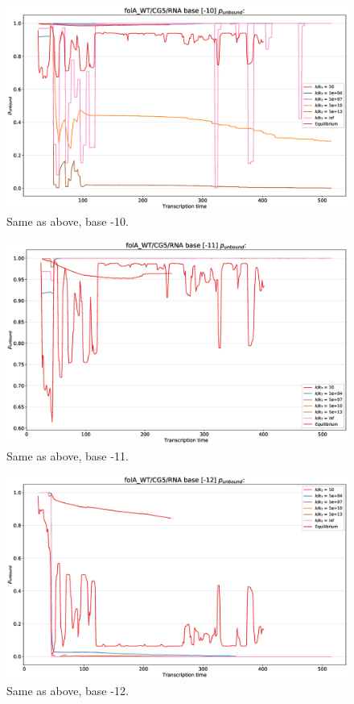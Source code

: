 \documentclass[11pt, a4paper]{article}
\begin{document}
\begin{figure}
\centering
\includegraphics[width=\linewidth]{p_unbound/RNA_p_unbound_base[-10]_k_tuning}
\caption{Same as above, base -10.}
\label{fig:RNA_p_unbound_base[-10]_k_tuning}
\end{figure}
\begin{figure}
\centering
\includegraphics[width=\linewidth]{p_unbound/RNA_p_unbound_base[-11]_k_tuning}
\caption{Same as above, base -11.}
\label{fig:RNA_p_unbound_base[-11]_k_tuning}
\end{figure}
\begin{figure}
\centering
\includegraphics[width=\linewidth]{p_unbound/RNA_p_unbound_base[-12]_k_tuning}
\caption{Same as above, base -12.}
\label{fig:RNA_p_unbound_base[-12]_k_tuning}
\end{figure}
\end{document}
